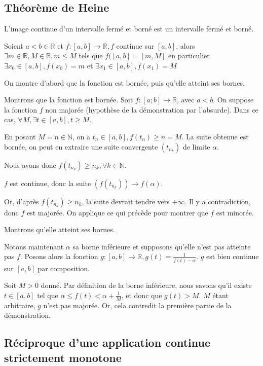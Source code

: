 \documentclass[french]{yLectureNote}
\begin{document}
\subsection{Théorème de Heine}
\begin{theorem}
L'image continue d'un intervalle fermé et borné est un intervalle fermé et borné.

Soient $ a<b \in\mathbb{R}$ et $f:[a,b] \to \mathbb{R}, f$ continue sur $[a,b]$, alors $\exists m\in\mathbb{R},M\in\mathbb{R}, m\leq M$ tels que $f([a,b] = [m,M]$ en particulier $\exists x_0\in[a,b], f(x_0) = m$ et $\exists x_1\in[a,b], f(x_1) = M$
\end{theorem}
\begin{myproof}{}
On montre d'abord que la fonction est bornée, puis qu'elle atteint ses bornes.

Montrons que la fonction est bornée. Soit $f:[a;b]\to \mathbb{R}$, avec $a<b$. On suppose la fonction $f$ non majorée (hypothèse de la démonstration par l'absurde). Dans ce cas, $\forall M,\exists t \in[a,b], t\geq M$.

En posant $M=n\in\mathbb{N}$, on a $t_n\in[a,b],f(t_n) \geq n = M$. La suite obtenue est bornée, on peut en extraire une suite convergente $(t_{n_k})$ de limite $\alpha$.

Nous avons donc $f(t_{n_k}) \geq n_k, \forall k\in\mathbb{N}$.

$f$ est continue, donc la suite $(f(t_{n_k}))\to f(\alpha)$.

Or, d'après $f(t_{n_k}) \geq n_k$, la suite devrait tendre vers $+\infty$. Il y a contradiction, donc $f$ est majorée. On applique ce qui précède pour montrer que $f$ est minorée.

Montrons qu'elle atteint ses bornes.

Notons maintenant $\alpha$ sa borne inférieure et supposons qu'elle n'est pas atteinte pas $f$. Posons alors la fonction $\displaystyle g:[a,b] \to \mathbb{R}, g(t) = \frac{1}{f(t)-\alpha}$. $g$ est bien continue sur $[a,b]$ par composition.

Soit $M>0$ donné. Par définition de la borne inférieure, nous savons qu'il existe $t \in[a,b]$ tel que $\alpha\leq f(t)<\alpha+\frac{1}{M}$, et donc que $g(t) > M$. $M$ étant arbitraire, $g$ n'est pas majorée. Or, cela contredit la première partie de la démonstration.
\end{myproof}

\subsection{Réciproque d'une application continue strictement monotone}
\end{document}
